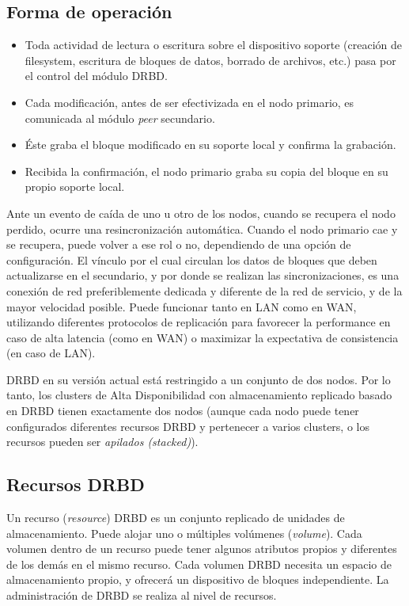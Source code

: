 \subsection{Forma de operación}
\begin{itemize}
	\item Toda actividad de lectura o escritura sobre el dispositivo soporte (creación de filesystem, escritura de bloques de datos, borrado de archivos, etc.) pasa por el control del módulo DRBD. 	
	\item Cada modificación, antes de ser efectivizada en el nodo primario, es comunicada al módulo \textit{peer} secundario. 	
	\item Éste graba el bloque modificado en su soporte local y confirma la grabación. 	
	\item Recibida la confirmación, el nodo primario graba su copia del bloque en su propio soporte local. 
\end{itemize} 


Ante un evento de caída de uno u otro de los nodos, cuando se recupera el nodo perdido, ocurre una resincronización automática. Cuando el nodo primario cae y se recupera, puede volver a ese rol o no, dependiendo de una opción de configuración. El vínculo por el cual circulan los datos de bloques que deben actualizarse en el secundario, y por donde se realizan las sincronizaciones, es una conexión de red  preferiblemente dedicada y diferente de la red de servicio, y de la mayor velocidad posible. Puede funcionar tanto en LAN como en WAN, utilizando diferentes protocolos de replicación para favorecer la performance en caso de alta latencia (como en WAN) o maximizar la expectativa de consistencia (en caso de LAN). 

DRBD en su versión actual está restringido a un conjunto de dos nodos. Por lo tanto, los clusters de Alta Disponibilidad con almacenamiento replicado basado en DRBD tienen exactamente dos nodos (aunque cada nodo puede tener configurados diferentes recursos DRBD y pertenecer a varios clusters, o los recursos pueden ser \textit{apilados (stacked)}). 

\subsection{Recursos DRBD}
Un recurso (\textit{resource}) DRBD es un conjunto replicado de unidades de almacenamiento. Puede alojar uno o múltiples volúmenes (\textit{volume}). Cada volumen dentro de un recurso puede tener algunos atributos propios y diferentes de los demás en el mismo recurso. Cada volumen DRBD necesita un espacio de almacenamiento propio, y ofrecerá un dispositivo de bloques independiente. La administración de DRBD se realiza al nivel de recursos.
    
